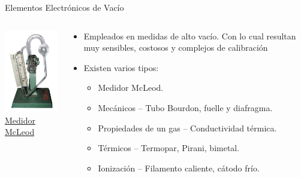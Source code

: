 \documentclass[aspectratio=169]{beamer}
\begin{document}
\begin{frame}{Elementos Electrónicos de Vacío}
    \begin{columns}[c, onlytextwidth]
    
     \begin{column}{0.5\textwidth}
            \centering
            \includegraphics[width=4cm]{fig/Presion/McLeod_gauge_01.jpg}
             \\ \tiny{\href{https://en.wikipedia.org/wiki/McLeod_gauge}{Medidor McLeod}}
        \end{column}
        \begin{column}{0.5\textwidth}
            \begin{itemize}
                \item Empleados en medidas de alto vacío. Con lo cual resultan muy sensibles, costosos y complejos de calibración 
                \item Existen varios tipos:
             \begin{itemize}
                 \item Medidor McLeod.
                 \item Mecánicos – Tubo Bourdon, fuelle y diafragma.
                 \item Propiedades de un gas – Conductividad térmica.
                 \item Térmicos – Termopar, Pirani, bimetal.
                 \item Ionización – Filamento caliente, cátodo frío.
             \end{itemize}
            \end{itemize}
        \end{column}
    \end{columns}
\end{frame}
\end{document}
